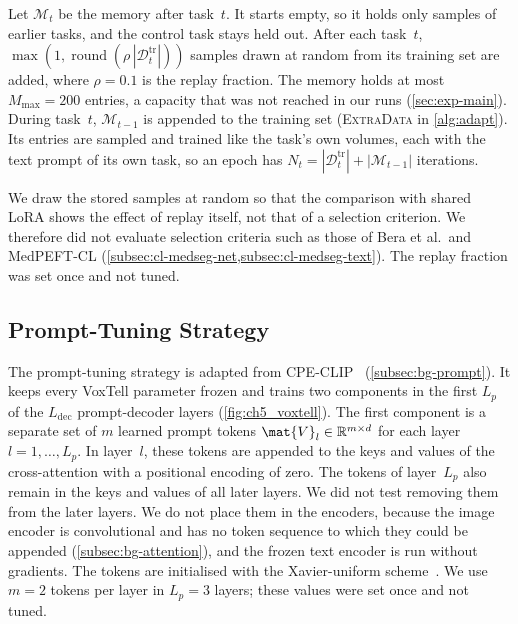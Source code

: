 Let $\mathcal{M}_t$ be the memory after task~$t$.
It starts empty, so it holds only samples of earlier tasks, and the control task stays held out.
After each task~$t$, $\max(1, \operatorname{round}(\rho \, |\mathcal{D}_t^{\mathrm{tr}}|))$ samples drawn at random from its training set are added, where $\rho = 0.1$ is the replay fraction.
The memory holds at most $M_{\max} = 200$ entries, a capacity that was not reached in our runs (\cref{sec:exp-main}).
During task~$t$, $\mathcal{M}_{t-1}$ is appended to the training set (\textsc{ExtraData} in \cref{alg:adapt}).
Its entries are sampled and trained like the task's own volumes, each with the text prompt of its own task, so an epoch has $N_t = |\mathcal{D}_t^{\mathrm{tr}}| + |\mathcal{M}_{t-1}|$ iterations.

We draw the stored samples at random so that the comparison with shared LoRA shows the effect of replay itself, not that of a selection criterion.
We therefore did not evaluate selection criteria such as those of Bera et al.\ and MedPEFT-CL (\cref{subsec:cl-medseg-net,subsec:cl-medseg-text}).
The replay fraction was set once and not tuned.

\subsection{Prompt-Tuning Strategy}
\label{subsec:method-prompt}

The prompt-tuning strategy is adapted from CPE-CLIP~\cite{D_Alessandro_2023} (\cref{subsec:bg-prompt}).
It keeps every VoxTell parameter frozen and trains two components in the first $L_p$ of the $L_{\mathrm{dec}}$ prompt-decoder layers (\cref{fig:ch5_voxtell}).
The first component is a separate set of $m$ learned prompt tokens $\mat{V}_l \in \mathbb{R}^{m \times d}$ for each layer $l = 1, \dots, L_p$.
In layer~$l$, these tokens are appended to the keys and values of the cross-attention with a positional encoding of zero.
The tokens of layer~$L_p$ also remain in the keys and values of all later layers.
We did not test removing them from the later layers.
We do not place them in the encoders, because the image encoder is convolutional and has no token sequence to which they could be appended (\cref{subsec:bg-attention}), and the frozen text encoder is run without gradients.
The tokens are initialised with the Xavier-uniform scheme~\cite{glorot2010understanding}.
We use $m = 2$ tokens per layer in $L_p = 3$ layers; these values were set once and not tuned.

